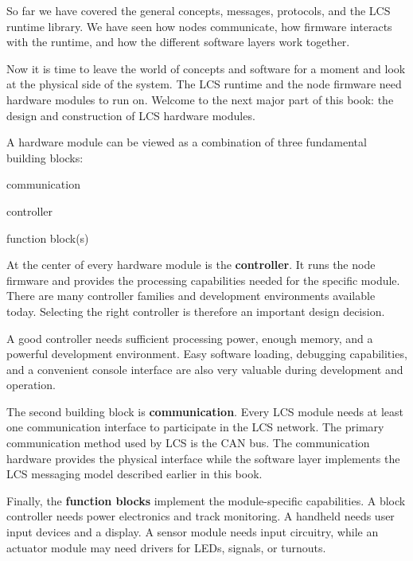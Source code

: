 
So far we have covered the general concepts, messages, protocols, and the LCS runtime library. 
We have seen how nodes communicate, how firmware interacts with the runtime, and how the different 
software layers work together.

Now it is time to leave the world of concepts and software for a moment and look at the physical 
side of the system. The LCS runtime and the node firmware need hardware modules to run on. 
Welcome to the next major part of this book: the design and construction of LCS hardware modules.

A hardware module can be viewed as a combination of three fundamental building blocks:

\begin{smallGapItemize}
\item communication
\item controller
\item function block(s)
\end{smallGapItemize}

At the center of every hardware module is the \textbf{controller}. It runs the node firmware and 
provides the processing capabilities needed for the specific module. There are many controller 
families and development environments available today. Selecting the right controller is therefore 
an important design decision.

A good controller needs sufficient processing power, enough memory, and a powerful development 
environment. Easy software loading, debugging capabilities, and a convenient console interface are 
also very valuable during development and operation.

The second building block is \textbf{communication}. Every LCS module needs at least one communication 
interface to participate in the LCS network. The primary communication method used by LCS is the CAN 
bus. The communication hardware provides the physical interface while the software layer implements 
the LCS messaging model described earlier in this book.

Finally, the \textbf{function blocks} implement the module-specific capabilities. A block controller 
needs power electronics and track monitoring. A handheld needs user input devices and a display. 
A sensor module needs input circuitry, while an actuator module may need drivers for LEDs, signals, 
or turnouts.

